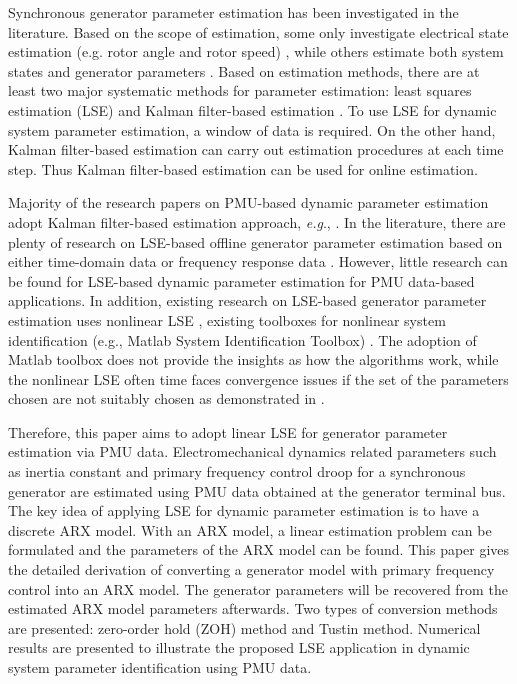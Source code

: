 \documentclass[10pt,journal,final]{IEEEtran}
\begin{document}
Synchronous generator parameter estimation has been investigated in the literature. Based on the scope of estimation, some only investigate electrical state estimation (e.g. rotor angle and rotor speed) \cite{yang2013power, Huang2009Dynamic}, while others estimate both system states and generator parameters \cite{Huang2009Application, Haung2006Model1, Huang2007Feasibility,Huang2011calibrating }. Based on estimation methods, there are at least two major systematic methods for parameter estimation: least squares estimation (LSE) \cite{ref6, ref8, ref9} and Kalman filter-based estimation \cite{Huang2013Generator,fan2013extended, Kamwa2011Dynamic, Kamwa2011Online, Pal2014pwrs_UKF}. To use LSE for dynamic system parameter estimation, a window of data is required. On the other hand, Kalman filter-based estimation can carry out estimation procedures at each time step. Thus Kalman filter-based estimation can be used for online estimation.

Majority of the research papers on PMU-based dynamic parameter estimation adopt Kalman filter-based estimation approach,\emph{ e.g}., \cite{Huang2013Generator,fan2013extended, Kamwa2011Dynamic, Kamwa2011Online,Pal2014pwrs_UKF }. In the literature, there are plenty of research on LSE-based offline generator parameter estimation based on either time-domain data or frequency response data \cite{ref6, ref7, ref8, ref9, ref12, ref14, ref15, ref16}. However, little research can be found for LSE-based dynamic parameter estimation for PMU data-based applications. In addition, existing research on LSE-based generator parameter estimation uses nonlinear LSE \cite{ref6}, existing toolboxes for nonlinear system identification (e.g., Matlab System Identification Toolbox) \cite{ref8}. The adoption of Matlab toolbox does not provide the insights as how the algorithms work, while the nonlinear LSE often time faces convergence issues if the set of the parameters chosen are not suitably chosen as demonstrated in \cite{ref6}.

Therefore, this paper aims to adopt linear LSE for generator parameter estimation via PMU data. Electromechanical dynamics related parameters such as inertia constant and primary frequency control droop for a synchronous generator are estimated using PMU data obtained at the generator terminal bus. The key idea of applying LSE for dynamic parameter estimation is to have a discrete ARX model. With an ARX model, a linear estimation problem can be formulated and the parameters of the ARX model can be found. This paper gives the detailed derivation of converting a generator model with primary frequency control into an ARX model. The generator parameters will be recovered from the estimated ARX model parameters afterwards. Two types of conversion methods are presented: zero-order hold (ZOH) method and Tustin method. Numerical results are presented to illustrate the proposed LSE application in dynamic system parameter identification using PMU data.
\end{document}
